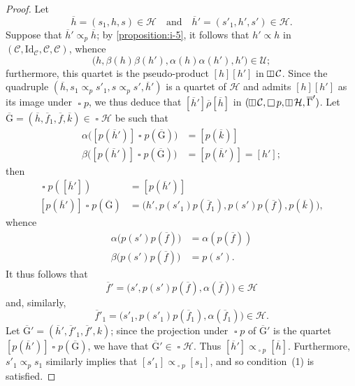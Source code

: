 \documentclass[a4paper,fleqn]{article}
\theoremstyle{plain}
\theoremstyle{definition}
\newcommand{\textand}{\quad\text{and}\quad}
\newcommand{\CC}{\mathcal{C}}
\newcommand{\HH}{\mathcal{H}}
\newcommand{\UU}{\mathcal{U}}
\newcommand{\relrhobar}{\mathrel{\overline{\rho}}}
\newcommand{\subs}{\mathrel{\propto}}
\newcommand{\Id}{\mathrm{Id}}
\newcommand{\vsqbox}{{\rotatebox{90}{$\boxminus$}}}
\DeclareMathOperator{\sq}{\square}
\DeclareMathOperator{\vsq}{\raisebox{-.1em}{$\vsqbox$}}
\begin{document}
\begin{proof}
  Let
  \[
    \overline{h}=(s_1,h,s)\in\HH
    \textand
    \overline{h}'=(s'_1,h',s')\in\HH.
  \]
  Suppose that $\overline{h}'\subs_p\overline{h}$;
  by \cref{proposition:i-5}, it follows that $h'\subs h$ in $(\CC,\Id_\CC,\CC,\CC)$, whence
  \[
    \big(h,\beta(h)\beta(h'),\alpha(h)\alpha(h'),h'\big)\in\UU;
  \]
  furthermore, this quartet is the pseudo-product $[h][h']$ in $\vsq\CC$.
  Since the quadruple $(\overline{h},s_1\subs_p s'_1,s\subs_p s',\overline{h}')$ is a quartet of $\HH$ and admits $[h][h']$ as its image under $\sq p$, we thus deduce that $[\overline{h}']\relrhobar[\overline{h}]$ in $(\vsq\CC,\sq p,\vsq\HH,\overline{\Gamma}')$.
  Let $\overline{\mathrm{G}}=(\overline{h},\overline{f}_1,\overline{f},\overline{k})\in\sq\HH$ be such that
  \[
    \begin{aligned}
      \alpha\big(
        [p(\overline{h}')]\sq p(\overline{\mathrm{G}})
        \big)
        &= [p(\overline{k})]
    \\\beta\big(
        [p(\overline{h}')]\sq p(\overline{\mathrm{G}})
        \big)
        &= [p(\overline{h}')]
        = [h'];
    \end{aligned}
  \]
  then
  \[
    \begin{aligned}
      \sq p([\overline{h}'])
      &= [p(\overline{h}')]
    \\{}[p(\overline{h}')]\sq p(\overline{\mathrm{G}})
      &= \big(
        h', p(s'_1)p(\overline{f}_1), p(s')p(\overline{f}), p(\overline{k})
      \big),
    \end{aligned}
  \]
  whence
  \[
    \begin{aligned}
      \alpha\big(p(s')p(\overline{f})\big)
      &= \alpha(p(\overline{f}))
    \\\beta\big(p(s')p(\overline{f})\big)
      &= p(s').
    \end{aligned}
  \]
  It thus follows that
  \[
    \overline{f}'
    = \big(
      s', p(s')p(\overline{f}), \alpha(\overline{f})
    \big)
    \in\HH
  \]
  and, similarly,
  \[
    \overline{f}'_1
    = \big(
      s'_1, p(s'_1)p(\overline{f}_1), \alpha(\overline{f}_1)
    \big)
    \in\HH.
  \]
  Let $\overline{\mathrm{G}}'=(\overline{h}',\overline{f}'_1,\overline{f}',k)$;
  since the projection under $\sq p$ of $\overline{\mathrm{G}}'$ is the quartet $[p(\overline{h}')]\sq p(\overline{\mathrm{G}})$, we have that $\overline{\mathrm{G}}'\in\sq\HH$.
  Thus $[\overline{h}']\subs_{\sq p}[\overline{h}]$.
  Furthermore, $s'_1\subs_p s_1$ similarly implies that $[s'_1]\subs_{\sq p}[s_1]$, and so condition~(1) is satisfied.


\end{proof}
\end{document}
